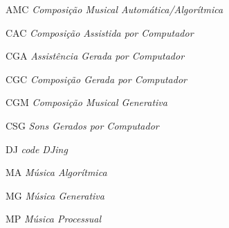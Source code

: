 \begin{siglas}\label{siglas}
  \item[AMC] \textit{Composição Musical Automática/Algorítmica}
  \item[CAC] \textit{Composição Assistida por Computador}
  \item[CGA] \textit{Assistência Gerada por Computador}
  \item[CGC] \textit{Composição Gerada por Computador}
  \item[CGM] \textit{Composição Musical Generativa}
  \item[CSG] \textit{Sons Gerados por Computador}
  \item[DJ] \textit{code DJing}
  \item[MA] \textit{Música Algorítmica}
  \item[MG] \textit{Música Generativa}
  \item[MP] \textit{Música Processual}
\end{siglas}\label{siglas}
